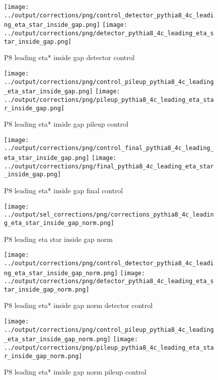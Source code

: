 \documentclass[11pt]{book}
\begin{document}
\begin{figure}[ht]
\centering
\texttt{[image: ../output/corrections/png/control\_detector\_pythia8\_4c\_leading\_eta\_star\_inside\_gap.png]}
\texttt{[image: ../output/corrections/png/detector\_pythia8\_4c\_leading\_eta\_star\_inside\_gap.png]}
\caption{P8 leading eta* inside gap detector control}
\label{fig:p8_leading_eta_star_inside_gap_detector_control}
\end{figure}

\begin{figure}[ht]
\centering
\texttt{[image: ../output/corrections/png/control\_pileup\_pythia8\_4c\_leading\_eta\_star\_inside\_gap.png]}
\texttt{[image: ../output/corrections/png/pileup\_pythia8\_4c\_leading\_eta\_star\_inside\_gap.png]}
\caption{P8 leading eta* inside gap pileup control}
\label{fig:p8_leading_eta_star_inside_gap_pileup_control}
\end{figure}


\begin{figure}[ht]
\centering
\texttt{[image: ../output/corrections/png/control\_final\_pythia8\_4c\_leading\_eta\_star\_inside\_gap.png]}
\texttt{[image: ../output/corrections/png/final\_pythia8\_4c\_leading\_eta\_star\_inside\_gap.png]}
\caption{P8 leading eta* inside gap final control}
\label{fig:p8_leading_eta_star_inside_gap_final_control}
\end{figure}

\begin{figure}[ht]
\centering
\texttt{[image: ../output/sel\_corrections/png/corrections\_pythia8\_4c\_leading\_eta\_star\_inside\_gap\_norm.png]}
\caption{P8 leading eta star inside gap norm}
\label{fig:p8_leading_eta_star_inside_gap_norm}
\end{figure}


\begin{figure}[ht]
\centering
\texttt{[image: ../output/corrections/png/control\_detector\_pythia8\_4c\_leading\_eta\_star\_inside\_gap\_norm.png]}
\texttt{[image: ../output/corrections/png/detector\_pythia8\_4c\_leading\_eta\_star\_inside\_gap\_norm.png]}
\caption{P8 leading eta* inside gap norm detector control}
\label{fig:p8_leading_eta_star_inside_gap_norm_detector_control}
\end{figure}

\begin{figure}[ht]
\centering
\texttt{[image: ../output/corrections/png/control\_pileup\_pythia8\_4c\_leading\_eta\_star\_inside\_gap\_norm.png]}
\texttt{[image: ../output/corrections/png/pileup\_pythia8\_4c\_leading\_eta\_star\_inside\_gap\_norm.png]}
\caption{P8 leading eta* inside gap norm pileup control}
\label{fig:p8_leading_eta_star_inside_gap_norm_pileup_control}
\end{figure}
\end{document}
